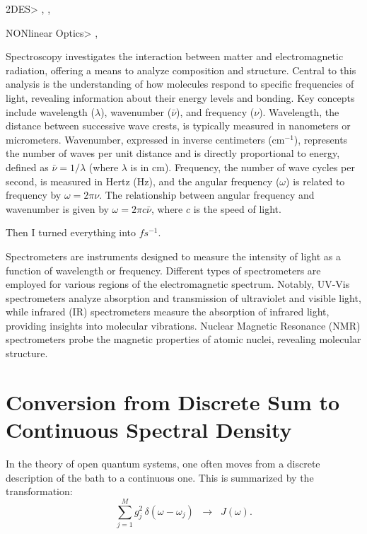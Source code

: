 2DES> \cite{krumland2023twodimensional}, \cite{Segarra-Martí2018}, \cite{Sun2024}



NONlinear Optics> \cite{Hamm2005}, \cite{Mukamel1995}












Spectroscopy investigates the interaction between matter and electromagnetic radiation, offering a means to analyze composition and structure.
Central to this analysis is the understanding of how molecules respond to specific frequencies of light, revealing information about their energy levels and bonding.
Key concepts include wavelength ($\lambda$), wavenumber ($\bar{\nu}$), and frequency ($\nu$).
Wavelength, the distance between successive wave crests, is typically measured in nanometers or micrometers.
Wavenumber, expressed in inverse centimeters (cm$^{-1}$), represents the number of waves per unit distance and is directly proportional to energy, defined as $\bar{\nu} = 1/\lambda$ (where $\lambda$ is in cm).
Frequency, the number of wave cycles per second, is measured in Hertz (Hz), and the angular frequency ($\omega$) is related to frequency by $\omega = 2\pi\nu$.
The relationship between angular frequency and wavenumber is given by $\omega = 2\pi c \bar{\nu}$, where $c$ is the speed of light.

Then I turned everything into $fs^{-1}$.


Spectrometers are instruments designed to measure the intensity of light as a function of wavelength or frequency.
Different types of spectrometers are employed for various regions of the electromagnetic spectrum.
Notably, UV-Vis spectrometers analyze absorption and transmission of ultraviolet and visible light, while infrared (IR) spectrometers measure the absorption of infrared light, providing insights into molecular vibrations.
Nuclear Magnetic Resonance (NMR) spectrometers probe the magnetic properties of atomic nuclei, revealing molecular structure.




\section*{Conversion from Discrete Sum to Continuous Spectral Density}

\noindent In the theory of open quantum systems, one often moves from a discrete description of the bath to a continuous one. This is summarized by the transformation:
\[
\sum_{j=1}^{M} g_j^2 \,\delta(\omega - \omega_j)
\;\;\longrightarrow\;\;
J(\omega).
\]

